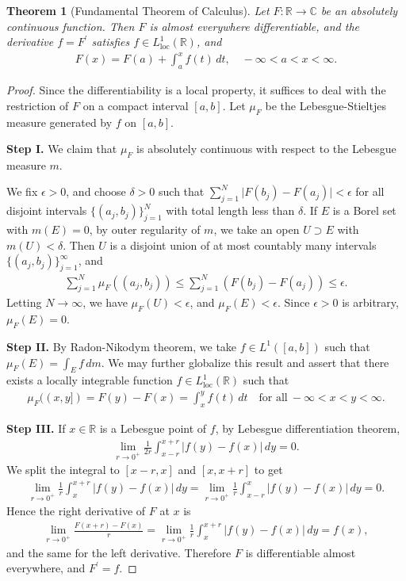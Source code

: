 \documentclass{article}
\numberwithin{equation}{section}
\newcommand{\bbC}{\mathbb{C}}
\newcommand{\bbR}{\mathbb{R}}
\newcommand{\loc}{\mathrm{loc}}
\theoremstyle{plain}
\newtheorem{theorem}{Theorem}[section]
\theoremstyle{definition}
\begin{document}
\begin{theorem}[Fundamental Theorem of Calculus]
Let $F:\bbR\to\bbC$ be an absolutely continuous function. Then $F$ is almost everywhere differentiable, and the derivative $f=F^\prime$ satisfies $f\in L^1_\loc(\bbR)$, and
\begin{align*}
	F(x)=F(a)+\int_a^x f(t)\,dt,\quad -\infty<a<x<\infty.
\end{align*}
\end{theorem}
\begin{proof}
Since the differentiability is a local property, it suffices to deal with the restriction of $F$ on a compact interval $[a,b]$. Let $\mu_F$ be the Lebesgue-Stieltjes measure generated by $f$ on $[a,b]$.

\item\textbf{Step I.} We claim that $\mu_F$ is absolutely continuous with respect to the Lebesgue measure $m$.

We fix $\epsilon>0$, and choose $\delta>0$ such that $\sum_{j=1}^N\vert F(b_j)-F(a_j)\vert<\epsilon$ for all disjoint intervals $\{(a_j,b_j)\}_{j=1}^N$ with total length less than $\delta$. If $E$ is a Borel set with $m(E)=0$, by outer regularity of $m$, we take an open $U\supset E$ with $m(U)<\delta$. Then $U$ is a disjoint union of at most countably many intervals $\{(a_j,b_j)\}_{j=1}^\infty$, and
\begin{align*}
	\sum_{j=1}^N\mu_F((a_j,b_j))\leq\sum_{j=1}^N\left(F(b_j)-F(a_j)\right)\leq\epsilon.
\end{align*}
Letting $N\to\infty$, we have $\mu_F(U)<\epsilon$, and $\mu_F(E)<\epsilon$. Since $\epsilon>0$ is arbitrary, $\mu_F(E)=0$.

\item\textbf{Step II.} By Radon-Nikodym theorem, we take $f\in L^1([a,b])$ such that $\mu_F(E)=\int_E f\,dm$. We may further globalize this result and assert that there exists a locally integrable function $f\in L^1_\loc(\bbR)$ such that
\begin{align*}
	\mu_F((x,y])=F(y)-F(x)=\int_x^y f(t)\,dt\quad\text{for all}\ -\infty<x<y<\infty.
\end{align*}

\item\textbf{Step III.} If $x\in\bbR$ is a Lebesgue point of $f$, by Lebesgue differentiation theorem,
\begin{align*}
	\lim_{r\to 0^+}\frac{1}{2r}\int_{x-r}^{x+r}\vert f(y)-f(x)\vert\,dy=0.
\end{align*}
We split the integral to $[x-r,x]$ and $[x,x+r]$ to get
\begin{align*}
	\lim_{r\to 0^+}\frac{1}{r}\int_{x}^{x+r}\vert f(y)-f(x)\vert\,dy=\lim_{r\to 0^+}\frac{1}{r}\int_{x-r}^{x}\vert f(y)-f(x)\vert\,dy=0.
\end{align*}
Hence the right derivative of $F$ at $x$ is
\begin{align*}
	\lim_{r\to 0^+}\frac{F(x+r)-F(x)}{r}=\lim_{r\to 0^+}\frac{1}{r}\int_{x}^{x+r}\vert f(y)-f(x)\vert\,dy=f(x),
\end{align*}
and the same for the left derivative. Therefore $F$ is differentiable almost everywhere, and $F^\prime=f$.
\end{proof}
\end{document}
